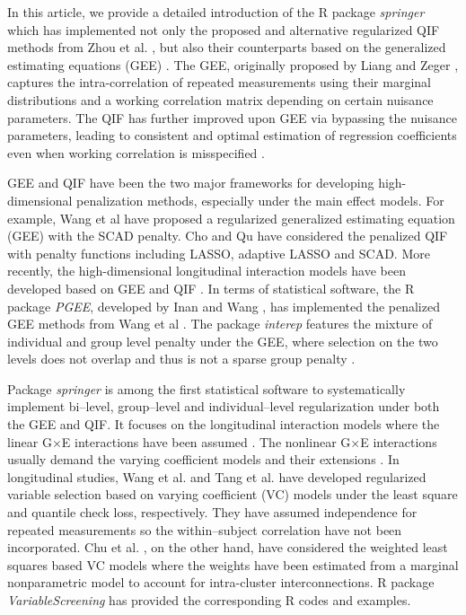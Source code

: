 \documentclass[12pt]{article}
\begin{document}
 
In this article, we provide a detailed introduction of the R package \emph{springer} which has implemented not only the proposed and alternative regularized QIF methods from Zhou et al. \cite{zhou2022sparse}, but also their counterparts based on the generalized estimating equations (GEE) \cite{LZ}. The GEE, originally proposed by Liang and Zeger \cite{LZ}, captures the intra-correlation of repeated measurements using their marginal distributions and a working correlation matrix depending on certain nuisance parameters. The QIF has further improved upon GEE via bypassing the nuisance parameters, leading to consistent and optimal estimation of regression coefficients even when working correlation is misspecified \cite{qu2000improving}. 

GEE and QIF have been the two major frameworks for developing high-dimensional penalization methods, especially under the main effect models. For example,  Wang et al \cite{WZQ} have proposed a regularized generalized estimating equation (GEE) with the SCAD penalty. Cho and Qu \cite{CQ} have considered the penalized QIF with penalty functions including LASSO, adaptive LASSO and SCAD. More recently, the high-dimensional longitudinal interaction models have been developed based on GEE and QIF \cite{zhou2019penalized,zhou2022sparse}. In terms of statistical software, the R package \emph{PGEE}, developed by Inan and Wang \cite{inan2017pgee},  has implemented the penalized GEE methods from Wang et al \cite{WZQ}. The  package \emph{interep} features the mixture of individual and group level penalty under the GEE, where selection on the two levels does not overlap and thus is not a sparse group penalty  \cite{zhou2022interep,zhou2019penalized}. 

 
Package \emph{springer} is among the first statistical software to systematically implement bi--level, group--level and individual--level regularization under both the GEE and QIF. It focuses on the longitudinal interaction models where the linear G$\times$E interactions have been assumed \cite{zhou2021gene}. The nonlinear G$\times$E interactions usually demand the varying coefficient models and their extensions \cite{wu2018additive,wu2013novel,ren2020semiparametric}. In longitudinal studies, Wang et al. \cite{wang2008variable} and Tang et al. \cite{tang2013variable} have developed regularized variable selection based on varying coefficient (VC) models under the least square and quantile check loss, respectively. They have assumed independence for repeated measurements so the  within--subject correlation have not been incorporated. Chu et al. \cite{chu2016feature}, on the other hand, have considered the weighted least squares based VC models where the weights have been estimated from a marginal nonparametric model to account for intra-cluster interconnections. R package \emph{VariableScreening} has provided the corresponding R codes and examples.   
  
\end{document}
